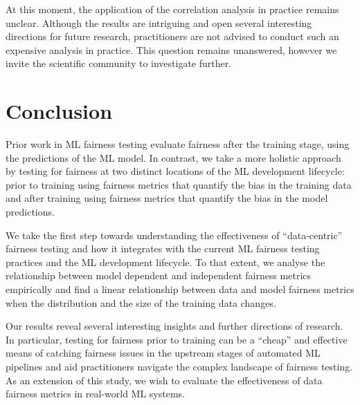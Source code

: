\documentclass[conference,review,anonymous]{IEEEtran}
\begin{document}

At this moment, the application of the correlation analysis in
practice remains unclear. Although the results are intriguing and open
several interesting directions for future research, practitioners are
not advised to conduct such an expensive analysis in practice. This
question remains unanswered, however we invite the scientific
community to investigate further.

\section{Conclusion}

Prior work in ML fairness testing evaluate fairness after the training
stage, using the predictions of the ML model. In contrast, we take a
more holistic approach by testing for fairness at two distinct
locations of the ML development lifecycle: prior to training using
fairness metrics that quantify the bias in the training data and after
training using fairness metrics that quantify the bias in the model
predictions.


We take the first step towards understanding the effectiveness of
``data-centric'' fairness testing and how it integrates with the
current ML fairness testing practices and the ML development
lifecycle. To that extent, we analyse the relationship between model
dependent and independent fairness metrics empirically and find a
linear relationship between data and model fairness metrics when the
distribution and the size of the training data changes.

Our results reveal several interesting insights and further directions
of research. In particular, testing for fairness prior to training can
be a ``cheap'' and effective means of catching fairness issues in the
upstream stages of automated ML pipelines and aid practitioners
navigate the complex landscape of fairness testing. As an extension of
this study, we wish to evaluate the effectiveness of data fairness
metrics in real-world ML systems.



\end{document}
